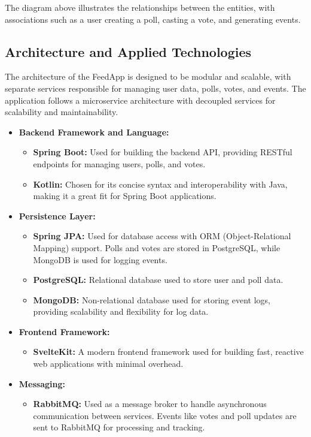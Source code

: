 The diagram above illustrates the relationships between the entities, with associations such as a user creating a poll, casting a vote, and generating events.

\subsection{Architecture and Applied Technologies}
The architecture of the FeedApp is designed to be modular and scalable, with separate services responsible for managing user data, polls, votes, and events. The application follows a microservice architecture with decoupled services for scalability and maintainability.

\begin{itemize}
    \item \textbf{Backend Framework and Language:} 
    \begin{itemize}
        \item \textbf{Spring Boot:} Used for building the backend API, providing RESTful endpoints for managing users, polls, and votes.
        \item \textbf{Kotlin:} Chosen for its concise syntax and interoperability with Java, making it a great fit for Spring Boot applications.
    \end{itemize}
    
    \item \textbf{Persistence Layer:} 
    \begin{itemize}
        \item \textbf{Spring JPA:} Used for database access with ORM (Object-Relational Mapping) support. Polls and votes are stored in PostgreSQL, while MongoDB is used for logging events.
        \item \textbf{PostgreSQL:} Relational database used to store user and poll data.
        \item \textbf{MongoDB:} Non-relational database used for storing event logs, providing scalability and flexibility for log data.
    \end{itemize}
    
    \item \textbf{Frontend Framework:} 
    \begin{itemize}
        \item \textbf{SvelteKit:} A modern frontend framework used for building fast, reactive web applications with minimal overhead.
    \end{itemize}
    
    \item \textbf{Messaging:}
    \begin{itemize}
        \item \textbf{RabbitMQ:} Used as a message broker to handle asynchronous communication between services. Events like votes and poll updates are sent to RabbitMQ for processing and tracking.
    \end{itemize}


\end{itemize}

